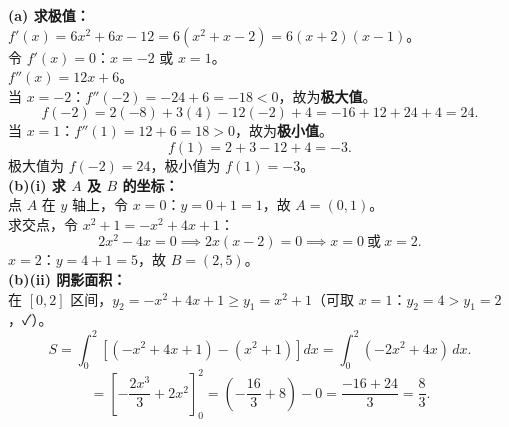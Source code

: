 \documentclass[12pt,a4paper]{ctexart}
\newenvironment{solution}
  {%
    \par\noindent
  }
  {\par}
\begin{document}
\begin{solution}
    \textbf{(a) 求极值：} \\
    $f'(x) = 6x^2 + 6x - 12 = 6(x^2+x-2) = 6(x+2)(x-1)$。\\
    令 $f'(x)=0$：$x = -2$ 或 $x = 1$。\\

    $f''(x) = 12x + 6$。\\
    当 $x=-2$：$f''(-2) = -24+6 = -18 < 0$，故为\textbf{极大值}。\\
    \[
        f(-2) = 2(-8)+3(4)-12(-2)+4 = -16+12+24+4 = 24.
    \]
    当 $x=1$：$f''(1) = 12+6 = 18 > 0$，故为\textbf{极小值}。\\
    \[
        f(1) = 2+3-12+4 = -3.
    \]
    极大值为 $f(-2) = 24$，极小值为 $f(1) = -3$。\\

    \textbf{(b)(i) 求 $A$ 及 $B$ 的坐标：} \\
    点 $A$ 在 $y$ 轴上，令 $x=0$：$y=0+1=1$，故 $A=(0,1)$。\\
    求交点，令 $x^2+1 = -x^2+4x+1$：
    \[
        2x^2 - 4x = 0 \implies 2x(x-2) = 0 \implies x=0\ \text{或}\ x=2.
    \]
    $x=2$：$y=4+1=5$，故 $B=(2,5)$。\\

    \textbf{(b)(ii) 阴影面积：} \\
    在 $[0,2]$ 区间，$y_2 = -x^2+4x+1 \ge y_1 = x^2+1$（可取 $x=1$：$y_2=4>y_1=2$，✓）。\\
    \[
        S = \int_0^2 \left[(-x^2+4x+1)-(x^2+1)\right]dx
        = \int_0^2 (-2x^2+4x)\,dx.
    \]
    \[
        = \left[-\frac{2x^3}{3}+2x^2\right]_0^2
        = \left(-\frac{16}{3}+8\right) - 0
        = \frac{-16+24}{3}
        = \frac{8}{3}.
    \]
\end{solution}
\end{document}
